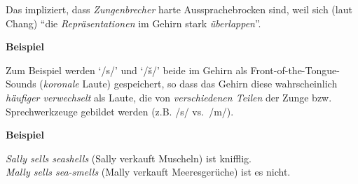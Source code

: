 \documentclass[
  letterpaper,
]{scrbook}
\begin{document}
Das impliziert, dass \emph{Zungenbrecher} harte Aussprachebrocken sind,
weil sich (laut Chang) ``die \emph{Repräsentationen} im Gehirn stark
\emph{überlappen}''.

\begin{tcolorbox}[enhanced jigsaw, rightrule=.15mm, arc=.35mm, breakable, colframe=quarto-callout-note-color-frame, left=2mm, colback=white, bottomrule=.15mm, toprule=.15mm, leftrule=.75mm, opacityback=0]
\begin{minipage}[t]{5.5mm}
\textcolor{quarto-callout-note-color}{\faInfo}
\end{minipage}%
\begin{minipage}[t]{\textwidth - 5.5mm}

\textbf{Beispiel}\vspace{2mm}

Zum Beispiel werden `/s/' und `/š/' beide im Gehirn als
Front-of-the-Tongue-Sounds (\emph{koronale} Laute) gespeichert, so dass
das Gehirn diese wahrscheinlich \emph{häufiger verwechselt} als Laute,
die von \emph{verschiedenen Teilen} der Zunge bzw. Sprechwerkzeuge
gebildet werden (z.B. /s/ vs.~/m/).

\end{minipage}%
\end{tcolorbox}

\begin{tcolorbox}[enhanced jigsaw, rightrule=.15mm, arc=.35mm, breakable, colframe=quarto-callout-note-color-frame, left=2mm, colback=white, bottomrule=.15mm, toprule=.15mm, leftrule=.75mm, opacityback=0]
\begin{minipage}[t]{5.5mm}
\textcolor{quarto-callout-note-color}{\faInfo}
\end{minipage}%
\begin{minipage}[t]{\textwidth - 5.5mm}

\textbf{Beispiel}\vspace{2mm}

\emph{Sally sells seashells} (Sally verkauft Muscheln) ist knifflig.\\
\emph{Mally sells sea-smells} (Mally verkauft Meeresgerüche) ist es
nicht.

\end{minipage}%
\end{tcolorbox}
\end{document}
